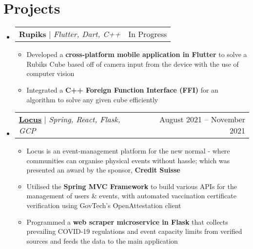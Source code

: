 \documentclass[letterpaper,11pt]{article}
\makeatletter
\newcommand{\resumeItem}[1]{
  \item\small{
    {#1 \vspace{-2pt}}
  }
}
\newcommand{\resumeProjectHeading}[2]{
    \item
    \begin{tabular*}{0.97\textwidth}{l@{\extracolsep{\fill}}r}
      \small#1 & #2 \\
    \end{tabular*}\vspace{-7pt}
}
\newcommand{\resumeSubHeadingListStart}{\begin{itemize}[leftmargin=0.15in, label={}]}
\newcommand{\resumeSubHeadingListEnd}{\end{itemize}}
\newcommand{\resumeItemListStart}{\begin{itemize}}
\newcommand{\resumeItemListEnd}{\end{itemize}\vspace{-5pt}}
\makeatother
\begin{document}
\section{Projects}
    \resumeSubHeadingListStart
      \resumeProjectHeading
          {\textbf{Rupiks} $|$ \emph{Flutter, Dart, C++}}{In Progress}
          \resumeItemListStart
            \resumeItem{Developed a \textbf{cross-platform mobile application in Flutter} to solve a Rubiks Cube based off of camera input from the device with the use of computer vision}
            \resumeItem{Integrated a \textbf{C++ Foreign Function Interface (FFI)} for an algorithm to solve any given cube efficiently}
          \resumeItemListEnd
      \resumeProjectHeading
          {\textbf{\href{https://github.com/omerwyo/Locus}{\underline{Locus}}} $|$ \emph{Spring, React, Flask, GCP}}{August 2021 -- November 2021}
          \resumeItemListStart
            \resumeItem{Locus is an event-management platform for the new normal - where communities can organise physical events without hassle; which was presented an award by the sponsor, \textbf{Credit Suisse}}
            \resumeItem{Utilised the \textbf{Spring MVC Framework} to build various APIs for the management of users \& events, with automated vaccination certificate verification using GovTech's OpenAttestation client}
            \resumeItem{Programmed a \textbf{web scraper microservice in Flask} that collects prevailing COVID-19 regulations and event capacity limits from verified sources and feeds the data to the main application}
          \resumeItemListEnd
    \resumeSubHeadingListEnd
%
\end{document}
